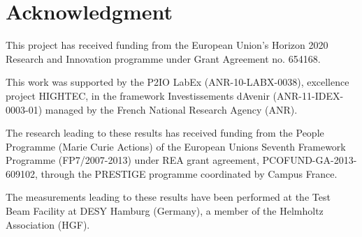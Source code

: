 \documentclass[journal]{IEEEtran}
\begin{document}
\appendices
\section*{Acknowledgment}

This project has received funding from the European Union’s Horizon 2020 Research and Innovation programme under Grant Agreement no. 654168.

This work was supported by the P2IO LabEx (ANR-10-LABX-0038), excellence project HIGHTEC,
in the framework {\textquotesingle}Investissements d{\textquotesingle}Avenir{\textquotesingle}
(ANR-11-IDEX-0003-01) managed by the French National Research Agency (ANR).

The research leading to these results has received funding from the People Programme (Marie
Curie Actions) of the European Union{\textquotesingle}s Seventh Framework Programme (FP7/2007-2013)
under REA grant agreement, PCOFUND-GA-2013-609102, through the PRESTIGE
programme coordinated by Campus France.

The measurements leading to these results have been performed at the Test Beam Facility at DESY Hamburg (Germany), a member of the Helmholtz Association (HGF).


\ifCLASSOPTIONcaptionsoff
  \newpage
\fi
\end{document}

